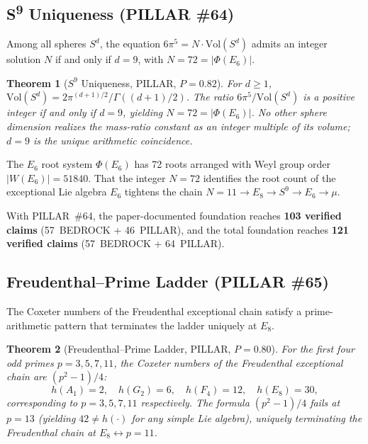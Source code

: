 \documentclass[aps,prd,twocolumn,superscriptaddress,floatfix,nofootinbib]{revtex4-2}
\newtheorem{theorem}{Theorem}
\theoremstyle{definition}
\theoremstyle{remark}
\begin{document}
\subsection{S\textsuperscript{9} Uniqueness (PILLAR \#64)}
\label{sec:s9-unique}

Among all spheres $S^d$, the equation $6\pi^5 = N \cdot \mathrm{Vol}(S^d)$
admits an integer solution $N$ if and only if $d=9$, with $N=72=|\Phi(E_6)|$.

\begin{theorem}[$S^9$ Uniqueness, PILLAR, $P{=}0.82$]
\label{thm:s9-unique}
For $d \geq 1$, $\mathrm{Vol}(S^d) = 2\pi^{(d+1)/2}/\Gamma((d+1)/2)$.
The ratio $6\pi^5 / \mathrm{Vol}(S^d)$ is a positive integer if and only if
$d = 9$, yielding $N = 72 = |\Phi(E_6)|$.
No other sphere dimension realizes the mass-ratio constant as an integer
multiple of its volume; $d = 9$ is the unique arithmetic coincidence.
\end{theorem}

The $E_6$ root system $\Phi(E_6)$ has 72 roots arranged with Weyl group order
$|W(E_6)| = 51840$.  That the integer $N = 72$ identifies the root count of the
exceptional Lie algebra $E_6$ tightens the chain
$N{=}11 \to E_8 \to S^9 \to E_6 \to \mu$.

\noindent
With PILLAR~\#64, the paper-documented foundation reaches
\textbf{103 verified claims} (57~BEDROCK + 46~PILLAR), and the total
foundation reaches \textbf{121 verified claims} (57~BEDROCK + 64~PILLAR).

\subsection{Freudenthal--Prime Ladder (PILLAR \#65)}
\label{sec:freudenthal-ladder}

The Coxeter numbers of the Freudenthal exceptional chain satisfy a
prime-arithmetic pattern that terminates the ladder uniquely at $E_8$.

\begin{theorem}[Freudenthal--Prime Ladder, PILLAR, $P{=}0.80$]
\label{thm:freudenthal-ladder}
For the first four odd primes $p = 3, 5, 7, 11$, the Coxeter numbers of the
Freudenthal exceptional chain are $(p^2-1)/4$:
\[
h(A_1)=2, \quad h(G_2)=6, \quad h(F_4)=12, \quad h(E_8)=30,
\]
corresponding to $p = 3, 5, 7, 11$ respectively.
The formula $(p^2-1)/4$ fails at $p=13$ (yielding $42 \neq h(\cdot)$ for any
simple Lie algebra), uniquely terminating the Freudenthal chain at
$E_8 \leftrightarrow p = 11$.
\end{theorem}
\end{document}
